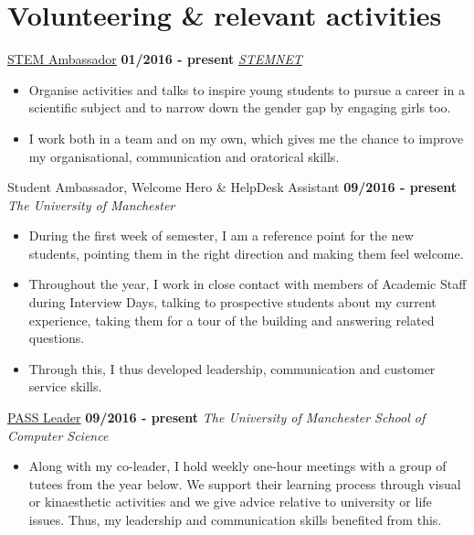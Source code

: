 \documentclass[]{friggeri-cv}
\begin{document}

\section{\color{red}Volunteering \color{gray} \& relevant activities}
\begin{entrylist}
  \entry
    {}
    {\href{http://www.stemnet.org.uk/ambassadors/}{STEM Ambassador}}
    {\textbf{01/2016 - present}}
    {\emph{\href{http://www.stemnet.org.uk/}{STEMNET}}}
    \begin{itemize}
        \item Organise activities and talks to inspire young students to pursue a career in a scientific subject and to narrow down the gender gap by engaging girls too.
        \item I work both in a team and on my own, which gives me the chance to improve my organisational, communication and oratorical skills.\\
    \end{itemize}
   \entry
    {}
    {Student Ambassador, Welcome Hero \& HelpDesk Assistant}
    {\textbf{09/2016 - present}}
    {\emph{The University of Manchester}}
    \begin{itemize}
        \item During the first week of semester, I am a reference point for the new students, pointing them in the right direction and making them feel welcome. 
        \item Throughout the year, I work in close contact with members of Academic Staff during Interview Days, talking to prospective students about my current experience, taking them for a tour of the building and answering related questions. 
        \item Through this, I thus developed leadership, communication and customer service skills.\\
    \end{itemize}
  \entry
    {}
    {\href{http://www.pass.manchester.ac.uk/}{PASS Leader}}
    {\textbf{09/2016 - present}}
    {\emph{The University of Manchester School of Computer Science}}
    \begin{itemize}
        \item Along with my co-leader, I hold weekly one-hour meetings with a group of tutees from the year below. We support their learning process through visual or kinaesthetic activities and we give advice relative to university or life issues. Thus, my leadership and communication skills benefited from this.\\

\end{itemize}
\end{entrylist}
\end{document}
